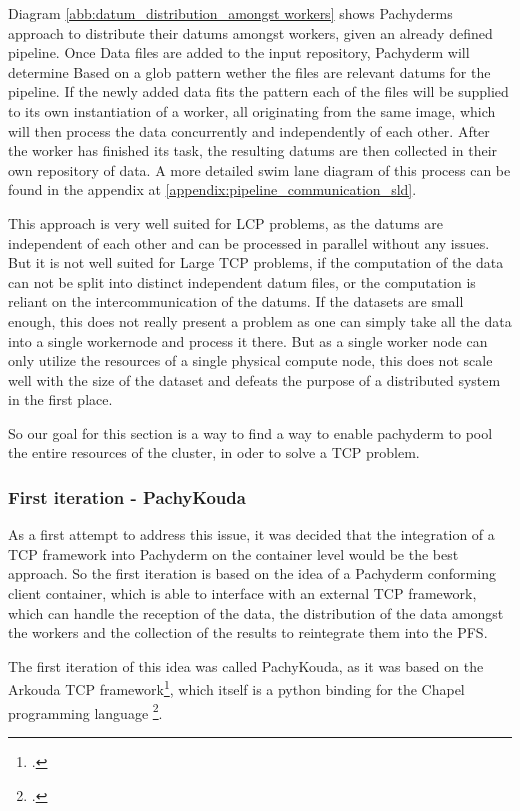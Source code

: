 Diagram \ref{abb:datum_distribution_amongst workers} shows Pachyderms approach to distribute their datums amongst workers, given an already defined pipeline.
Once Data files are added to the input repository, Pachyderm will determine Based on a glob pattern wether the files are relevant datums for the pipeline.
If the newly added data fits the pattern each of the files will be supplied to its own instantiation of a worker, all originating from the same image, which will then process the data concurrently and independently of each other.
After the worker has finished its task, the resulting datums are then collected in their own repository of data.
A more detailed swim lane diagram of this process can be found in the appendix at \ref{appendix:pipeline_communication_sld}.

This approach is very well suited for \ac{LCP} problems, as the datums are independent of each other and can be processed in parallel without any issues.
But it is not well suited for Large \ac{TCP} problems, if the computation of the data can not be split into distinct independent datum files, or the computation is reliant on the intercommunication of the datums.
If the datasets are small enough, this does not really present a problem as one can simply take all the data into a single workernode and process it there.
But as a single worker node can only utilize the resources of a single physical compute node, this does not scale well with the size of the dataset and defeats the purpose of a distributed system in the first place.

So our goal for this section is a way to find a way to enable pachyderm to pool the entire resources of the cluster, in oder to solve a \ac{TCP} problem.

\subsubsection{First iteration - PachyKouda}

As a first attempt to address this issue, it was decided that the integration of a \ac{TCP} framework into Pachyderm on the container level would be the best approach.
So the first iteration is based on the idea of a Pachyderm conforming client container, which is able to interface with an external \ac{TCP} framework,
which can handle the reception of the data, the distribution of the data amongst the workers and the collection of the results to reintegrate them into the \ac{PFS}.

The first iteration of this idea was called PachyKouda, as it was based on the Arkouda \ac{TCP} framework\footcite{ArkoudaGituhbRepository2023},
which itself is a python binding for the Chapel programming language \footcite{ChapellangChapelProductive}. 

